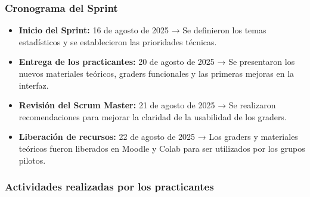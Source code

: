 \documentclass[letter,oneside,12pt,spanish]{report}
\begin{document}
\subsubsection*{Cronograma del Sprint}
\begin{itemize}
	\item \textbf{Inicio del Sprint:} 16 de agosto de 2025 → Se definieron los temas estadísticos y se establecieron las prioridades técnicas.
	\item \textbf{Entrega de los practicantes:} 20 de agosto de 2025 → Se presentaron los nuevos materiales teóricos, graders funcionales y las primeras mejoras en la interfaz.
	\item \textbf{Revisión del Scrum Master:} 21 de agosto de 2025 → Se realizaron recomendaciones para mejorar la claridad de la usabilidad de los graders.
	\item \textbf{Liberación de recursos:} 22 de agosto de 2025 → Los graders y materiales teóricos fueron liberados en Moodle y Colab para ser utilizados por los grupos pilotos.
\end{itemize}

\subsubsection*{Actividades realizadas por los practicantes}
\end{document}
